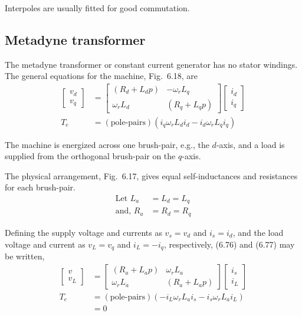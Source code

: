 \documentclass[a4paper,numbers=noenddot,12pt]{scrbook}
\begin{document}
    Interpoles are usually fitted for good commutation.

    \subsection{Metadyne transformer}
    The metadyne transformer or constant current generator has no stator windings. The general equations for the machine, Fig.\ 6.18, are
    \begin{align}
        \begin{bmatrix}
            v_d \\ v_q
        \end{bmatrix}
        & = 
        \begin{bmatrix}
            (R_d + L_d p) & - \omega_r L_q \\
            \omega_r L_d & (R_q + L_q p)
        \end{bmatrix}
        \begin{bmatrix}
            i_d \\ i_q
        \end{bmatrix} \\
        T_e & = (\text{pole-pairs})(i_q \omega_r L_d i_d - i_d \omega_r L_q i_q) 
        \label{eq:Eq6.77}
    \end{align}

    The machine is energized across one brush-pair, e.g., the $d$-axis, and a load is supplied from the orthogonal brush-pair on the $q$-axis.

    The physical arrangement, Fig.\ 6.17, gives equal self-inductances and resistances for each brush-pair.
    \begin{align*}
        \text{Let } L_a & = L_d = L_q \\
        \text{and, } R_a & = R_d = R_q 
        \label{}
    \end{align*}

    Defining the supply voltage and currents as $v_s = v_d$ and $i_s = i_d$, and the load voltage and current as $v_L = v_q$ and $i_L = -i_q$, respectively, (6.76) and (6.77) may be written,
    \begin{align}
        \begin{bmatrix}
            v \\ v_L
        \end{bmatrix}
        & = 
        \begin{bmatrix}
            (R_a + L_a p) & \omega_r L_a \\
            \omega_r L_a & (R_a + L_a p)
        \end{bmatrix}
        \begin{bmatrix}
            i_s \\ i_L
        \end{bmatrix} \\
        T_e & = (\text{pole-pairs})(- i_L \omega_r L_a i_s - i_s \omega_r L_a i_L)\\
        & = 0 \nonumber
        \label{eq:Eq6.79}
    \end{align}
\end{document}
